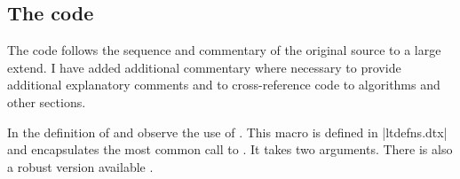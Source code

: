 %
% 
%
%
%
%
% 
 \subsection{The code}
 
The code follows the sequence and commentary of the original source to a large
extend. I have added additional commentary where necessary to provide
additional explanatory comments and to cross-reference code to algorithms
and other sections.
 
 
    \begin{teX}
    \end{teX}

In the definition of  and  observe the
use of . This macro is defined in |ltdefns.dtx| and encapsulates
the most common call to . It takes two arguments. There is
also a robust version available .

